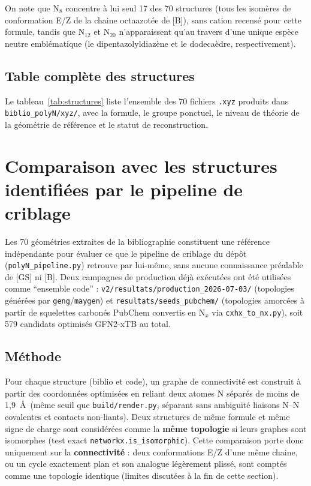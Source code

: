 \documentclass[11pt,a4paper]{article}
\begin{document}
On note que N$_8$ concentre \`a lui seul 17 des 70 structures (tous les
isom\`eres de conformation E/Z de la chaine octaazot\'ee de [B]), sans
cation recens\'e pour cette formule, tandis que N$_{12}$ et N$_{20}$
n'apparaissent qu'au travers d'une unique esp\`ece neutre embl\'ematique
(le dipentazolyldiaz\`ene et le dodeca\`edre, respectivement).

\subsection{Table compl\`ete des structures}

Le tableau~\ref{tab:structures} liste l'ensemble des 70 fichiers
\texttt{.xyz} produits dans \texttt{biblio\_polyN/xyz/}, avec la formule,
le groupe ponctuel, le niveau de th\'eorie de la g\'eom\'etrie de
r\'ef\'erence et le statut de reconstruction.

\begingroup
\small

\endgroup

\section{Comparaison avec les structures identifi\'ees par le pipeline de criblage}
\label{sec:comparaison-code}

Les 70 g\'eom\'etries extraites de la bibliographie constituent une
r\'ef\'erence ind\'ependante pour \'evaluer ce que le pipeline de criblage
du d\'ep\^ot (\texttt{polyN\_pipeline.py}) retrouve par lui-m\^eme, sans
aucune connaissance pr\'ealable de [GS] ni [B]. Deux campagnes de
production d\'ej\`a ex\'ecut\'ees ont \'et\'e utilis\'ees comme
``ensemble code'' : \texttt{v2/resultats/production\_2026-07-03/}
(topologies g\'en\'er\'ees par \texttt{geng}/\texttt{maygen}) et
\texttt{resultats/seeds\_pubchem/} (topologies amorc\'ees \`a partir de
squelettes carbon\'es PubChem convertis en N$_x$ via
\texttt{cxhx\_to\_nx.py}), soit 579 candidats optimis\'es GFN2-xTB au
total.

\subsection{M\'ethode}

Pour chaque structure (biblio et code), un graphe de connectivit\'e est
construit \`a partir des coordonn\'ees optimis\'ees en reliant deux atomes
N s\'epar\'es de moins de 1{,}9~\AA\ (m\^eme seuil que
\texttt{build/render.py}, s\'eparant sans ambigu\"it\'e liaisons N--N
covalentes et contacts non-liants). Deux structures de m\^eme formule et
m\^eme signe de charge sont consid\'er\'ees comme la \textbf{m\^eme
topologie} si leurs graphes sont isomorphes (test exact
\texttt{networkx.is\_isomorphic}). Cette comparaison porte donc
uniquement sur la \textbf{connectivit\'e} : deux conformations E/Z d'une
m\^eme chaine, ou un cycle exactement plan et son analogue l\'eg\`erement
pliss\'e, sont compt\'es comme une topologie identique (limites
discut\'ees \`a la fin de cette section).
\end{document}
